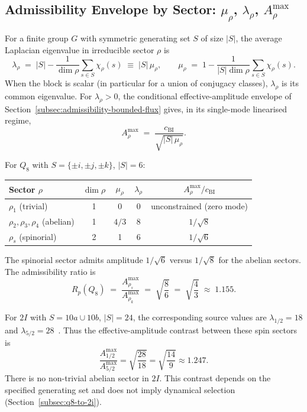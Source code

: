 \subsection{Admissibility Envelope by Sector: $\mu_\rho$, $\lambda_\rho$, $A_\rho^{\max}$}
  \label{subsec:admissibility-envelope-by-sector}

  For a finite group $G$ with symmetric generating set $S$ of size $|S|$, the
  average Laplacian eigenvalue in irreducible sector $\rho$ is
  \begin{equation}
    \lambda_\rho \;=\; |S| - \frac{1}{\dim\rho}\sum_{s\in S}\chi_\rho(s)
    \;\equiv\; |S|\,\mu_\rho,
    \qquad
    \mu_\rho \;=\; 1 - \frac{1}{|S|\dim\rho}\sum_{s\in S}\chi_\rho(s).
  \end{equation}
  When the block is scalar (in particular for a union of conjugacy classes), $\lambda_\rho$ is its
  common eigenvalue.
  For $\lambda_\rho>0$, the conditional effective-amplitude envelope of
  Section~\ref{subsec:admissibility-bounded-flux} gives, in its single-mode linearised regime,
  \begin{equation}
    A_\rho^{\max} \;=\; \frac{c_{\mathrm{BI}}}{\sqrt{|S|\,\mu_\rho}}.
  \end{equation}

  For $Q_8$ with $S=\{\pm i,\pm j,\pm k\}$, $|S|=6$:

  \begin{center}
    \begin{tabular}{lcccc}
      \hline
      Sector $\rho$ & $\dim\rho$ & $\mu_\rho$ & $\lambda_\rho$ & $A_\rho^{\max}/c_{\mathrm{BI}}$ \\
      \hline
      $\rho_1$ (trivial) & 1 & 0 & 0 & unconstrained (zero mode) \\
      $\rho_2,\rho_3,\rho_4$ (abelian) & 1 & $4/3$ & 8 & $1/\sqrt{8}$ \\
      $\rho_s$ (spinorial) & 2 & 1 & 6 & $1/\sqrt{6}$ \\
      \hline
    \end{tabular}
  \end{center}

  The spinorial sector admits amplitude $1/\sqrt{6}$ versus $1/\sqrt{8}$ for the
  abelian sectors.
  The admissibility ratio is
  \begin{equation}
    R_p(Q_8) \;=\; \frac{A_{\rho_s}^{\max}}{A_{\rho_k}^{\max}}
    \;=\; \sqrt{\frac{8}{6}} \;=\; \sqrt{\frac{4}{3}} \;\approx\; 1.155.
  \end{equation}

  For $2I$ with $S=10a\cup10b$, $|S|=24$, the corresponding source values are
  $\lambda_{1/2}=18$ and $\lambda_{5/2}=28$~\cite{Beau2026a1}.
  Thus the effective-amplitude contrast between these spin sectors is
  \begin{equation}
    \frac{A_{1/2}^{\max}}{A_{5/2}^{\max}}
    =\sqrt{\frac{28}{18}}=\sqrt{\frac{14}{9}}\approx1.247.
  \end{equation}
  There is no non-trivial abelian sector in $2I$.
  This contrast depends on the specified generating set and does not imply dynamical selection
  (Section~\ref{subsec:q8-to-2i}).
